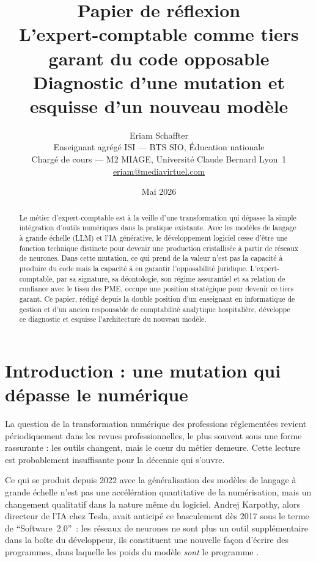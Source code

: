 \documentclass[12pt,a4paper]{article}
\title{%
  \vspace{-1cm}
  {\large Papier de réflexion}\\[0.5em]
  \textbf{L'expert-comptable comme tiers garant du code opposable}\\[0.4em]
  {\large Diagnostic d'une mutation et esquisse d'un nouveau modèle}%
}
\author{%
  Eriam Schaffter\\
  {\small Enseignant agrégé ISI --- BTS SIO, Éducation nationale}\\
  {\small Chargé de cours --- M2 MIAGE, Université Claude Bernard Lyon~1}\\
  {\small \href{mailto:eriam@mediavirtuel.com}{eriam@mediavirtuel.com}}
}
\date{Mai 2026}
\begin{document}
\maketitle
\thispagestyle{empty}

\begin{abstract}
Le métier d'expert-comptable est à la veille d'une transformation qui dépasse la simple intégration d'outils numériques dans la pratique existante. Avec les modèles de langage à grande échelle (LLM) et l'IA générative, le développement logiciel cesse d'être une fonction technique distincte pour devenir une production cristallisée à partir de réseaux de neurones. Dans cette mutation, ce qui prend de la valeur n'est pas la capacité à produire du code mais la capacité à en garantir l'opposabilité juridique. L'expert-comptable, par sa signature, sa déontologie, son régime assurantiel et sa relation de confiance avec le tissu des PME, occupe une position stratégique pour devenir ce tiers garant. Ce papier, rédigé depuis la double position d'un enseignant en informatique de gestion et d'un ancien responsable de comptabilité analytique hospitalière, développe ce diagnostic et esquisse l'architecture du nouveau modèle.
\end{abstract}

\tableofcontents
\newpage

\section{Introduction : une mutation qui dépasse le numérique}

La question de la transformation numérique des professions réglementées revient périodiquement dans les revues professionnelles, le plus souvent sous une forme rassurante : les outils changent, mais le cœur du métier demeure. Cette lecture est probablement insuffisante pour la décennie qui s'ouvre.

Ce qui se produit depuis 2022 avec la généralisation des modèles de langage à grande échelle n'est pas une accélération quantitative de la numérisation, mais un changement qualitatif dans la nature même du logiciel. Andrej Karpathy, alors directeur de l'IA chez Tesla, avait anticipé ce basculement dès 2017 sous le terme de \enquote{Software~2.0}~: les réseaux de neurones ne sont plus un outil supplémentaire dans la boîte du développeur, ils constituent une nouvelle façon d'écrire des programmes, dans laquelle les poids du modèle \emph{sont} le programme \parencite{karpathy2017}.
\end{document}
